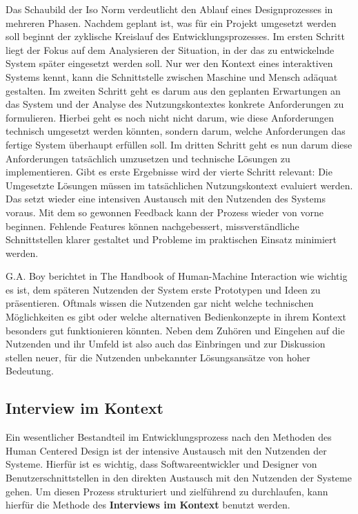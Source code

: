\documentclass[12pt]{article}
\begin{document}
Das Schaubild der Iso Norm verdeutlicht den Ablauf eines Designprozesses in
mehreren Phasen. Nachdem geplant ist, was für ein Projekt umgesetzt werden soll
beginnt der zyklische Kreislauf des Entwicklungsprozesses. Im ersten Schritt
liegt der Fokus auf dem Analysieren der Situation, in der das zu entwickelnde
System später eingesetzt werden soll. Nur wer den Kontext eines interaktiven
Systems kennt, kann die Schnittstelle zwischen Maschine und Mensch adäquat
gestalten. Im zweiten Schritt geht es darum aus den geplanten Erwartungen an
das System und der Analyse des Nutzungskontextes konkrete Anforderungen zu
formulieren. Hierbei geht es noch nicht nicht darum, wie diese Anforderungen
technisch umgesetzt werden könnten, sondern darum, welche Anforderungen das
fertige System überhaupt erfüllen soll. Im dritten Schritt geht es nun darum
diese Anforderungen tatsächlich umzusetzen und technische Lösungen zu
implementieren. Gibt es erste Ergebnisse wird der vierte Schritt relevant: Die
Umgesetzte Lösungen müssen im tatsächlichen Nutzungskontext evaluiert werden.
Das setzt wieder eine intensiven Austausch mit den Nutzenden des Systems
voraus. Mit dem so gewonnen Feedback kann der Prozess wieder von vorne
beginnen. Fehlende Features können nachgebessert, missverständliche
Schnittstellen klarer gestaltet und Probleme im praktischen Einsatz minimiert
werden.\cite{iso9241}

G.A. Boy berichtet in \glqq{}The Handbook of Human-Machine Interaction\grqq{}
wie wichtig es ist, dem späteren Nutzenden der System erste Prototypen und
Ideen zu präsentieren. Oftmals wissen die Nutzenden gar nicht welche
technischen Möglichkeiten es gibt oder welche alternativen Bedienkonzepte in
ihrem Kontext besonders gut funktionieren könnten. Neben dem Zuhören und
Eingehen auf die Nutzenden und ihr Umfeld ist also auch das Einbringen und zur
Diskussion stellen neuer, für die Nutzenden unbekannter Lösungsansätze von
hoher Bedeutung.\cite{HMI-HCD}

\subsection{Interview im Kontext}

Ein wesentlicher Bestandteil im Entwicklungsprozess nach den Methoden des Human
Centered Design ist der intensive Austausch mit den Nutzenden der Systeme.
Hierfür ist es wichtig, dass Softwareentwickler und Designer von
Benutzerschnittstellen in den direkten Austausch mit den Nutzenden der Systeme
gehen. Um diesen Prozess strukturiert und zielführend zu durchlaufen, kann
hierfür die Methode des \textbf{Interviews im Kontext} benutzt werden.
\end{document}
